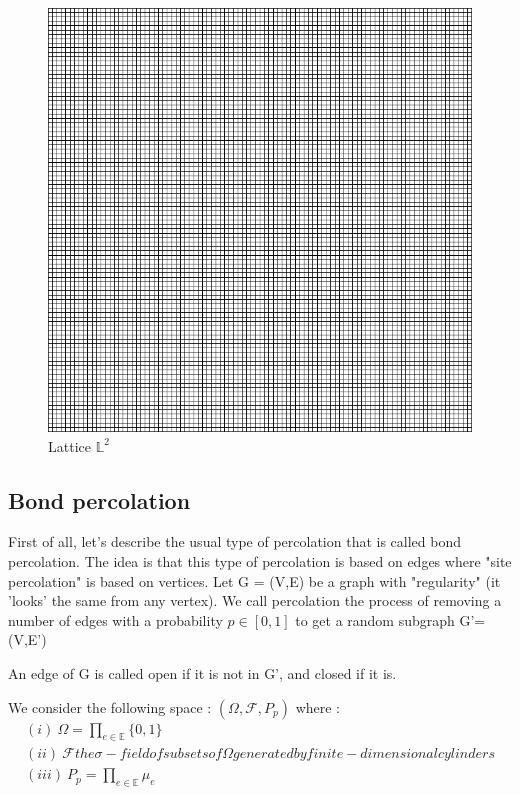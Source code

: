 \documentclass{article}
\begin{document}
\begin{figure}[ht]
\includegraphics[scale=0.75]{lattice}
\centering

\caption{Lattice $\mathbb{L}^2$}
\end{figure}

\subsection{Bond percolation}
First of all, let's describe the usual type of percolation that is called bond percolation. The idea is that this type of percolation is based on edges where "site percolation" is based on vertices. 
Let G = (V,E) be a graph with "regularity" (it 'looks' the same from any vertex). We call percolation the process of removing a number of edges with a probability $\textit{p}\in [0,1]$ to get a random subgraph G'=(V,E')

An edge of G is called open if it is not in G', and closed if it is. 

We consider the following space : $(\Omega, \mathscr{F}, P_p)$ where :
\begin{gather*}
(i) \ \Omega = \prod_{e \in \mathbb{E}}{\{0,1\}} \\
(ii) \ \mathscr{F} the \sigma-field of subsets of \Omega generated by finite-dimensional cylinders\\
(iii) \ P_p = \prod_{e \in \mathbb{E}}{\mu_{e}}
\end{gather*}
\end{document}

